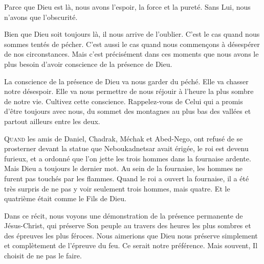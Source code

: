 
Parce que Dieu est là, nous avons l'espoir, la force et la pureté.
 Sans Lui, nous n'avons que l'obscurité. 

Bien que Dieu soit toujours là, il nous arrive de l'oublier.
 C'est le cas quand nous sommes tentés de pécher.
 C'est aussi le cas quand nous commen\c{c}ons à désespérer de nos circonstances.
 Mais c'est précisément dans ces moments que nous avons le plus besoin
 d'avoir conscience de la présence de Dieu. 

La conscience de la présence de Dieu va nous garder du péché.
 Elle va chasser notre désespoir. Elle va nous permettre de nous réjouir
 à l'heure la plus sombre de notre vie. Cultivez cette conscience.
 Rappelez-vous de Celui qui a promis d'être toujours avec nous,
 du sommet des montagnes au plus bas des vallées
 et partout ailleurs entre les deux. 

\dvrule






\lettrine{Q}{uand} les amis de Daniel, Chadrak, Méchak et Abed-Nego,
 ont refusé de se prosterner devant la statue que Neboukadnetsar avait érigée,
 le roi est devenu furieux, et a ordonné que l'on jette les trois hommes
 dans la fournaise ardente. Mais Dieu a toujours le dernier mot.
 Au sein de la fournaise, les hommes ne furent pas touchés par les flammes.
 Quand le roi a ouvert la fournaise, il a été très surpris de ne pas y voir
 seulement trois hommes, mais quatre.
 Et le quatrième était comme \Og le Fils de Dieu. \Fg{}

Dans ce récit, nous voyons une démonstration de la présence permanente
 de Jésus-Christ, qui préserve Son peuple au travers des heures
 les plus sombres et des  épreuves les plus féroces.
 Nous aimerions que Dieu nous préserve simplement et complètement
 de l'épreuve du feu. Ce serait notre préférence.
 Mais souvent, Il choisit de ne pas le faire. 

